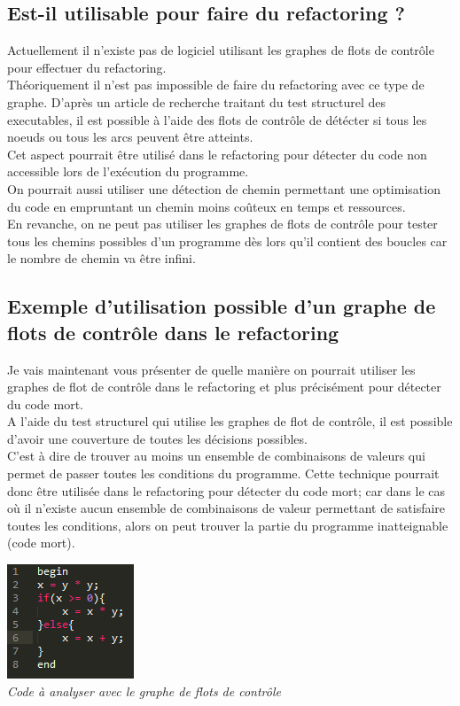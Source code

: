 \documentclass[a4paper,twoside,12pt,openright]{report}
\begin{document}
\subsection{Est-il utilisable pour faire du refactoring ?}
Actuellement il n'existe pas de logiciel utilisant les graphes de flots de contrôle pour effectuer du refactoring.\\
Théoriquement il n'est pas impossible de faire du refactoring avec ce type de graphe.
D'après un article de recherche traitant du test structurel des executables, il est possible à l'aide des flots de contrôle de détécter si tous les noeuds ou tous les arcs peuvent être atteints\cite{ref12}.\\
Cet aspect pourrait être utilisé dans le refactoring pour détecter du code non accessible lors de l'exécution du programme.\\
On pourrait aussi utiliser une détection de chemin
permettant une optimisation du code en empruntant un chemin moins coûteux en temps et ressources.\\
En revanche, on ne peut pas utiliser les graphes de flots de contrôle pour tester tous les chemins possibles d'un programme dès lors qu'il contient des boucles car le nombre de chemin va être infini.\\

\subsection{Exemple d'utilisation possible d'un graphe de flots de contrôle dans le refactoring}

Je vais maintenant vous présenter de quelle manière on pourrait utiliser les graphes de flot de contrôle dans le refactoring et plus précisément pour détecter du code mort.\\
A l'aide du test structurel qui utilise les graphes de flot de contrôle, il est possible d'avoir une couverture de toutes les décisions possibles\cite{ref13}.\\
C'est à dire de trouver au moins un ensemble de combinaisons de valeurs qui permet de passer toutes les conditions du programme. Cette technique pourrait donc être utilisée dans le refactoring pour détecter du code mort; car dans le cas où il n'existe aucun ensemble de combinaisons de valeur permettant de satisfaire toutes les conditions, alors on peut trouver la partie du programme inatteignable (code mort).\\

\begin{center}
\includegraphics[scale=1.5]{Image/ExempleCodeGraphe.png}\\
\itshape{Code à analyser avec le graphe de flots de contrôle}
\end{center}
\end{document}
